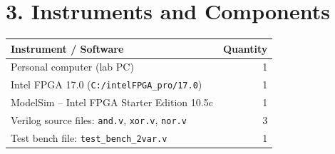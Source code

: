 \section*{3. Instruments and Components}

\begin{table}[H]
\centering
\small
\begin{tabularx}{0.8\textwidth}{X r}
\toprule
\textbf{Instrument / Software} & \textbf{Quantity} \\
\midrule
Personal computer (lab PC) & 1 \\
Intel FPGA 17.0 (\texttt{C:/intelFPGA\_pro/17.0}) & 1 \\
ModelSim -- Intel FPGA Starter Edition 10.5c & 1 \\
Verilog source files: \texttt{and.v}, \texttt{xor.v}, \texttt{nor.v} & 3 \\
Test bench file: \texttt{test\_bench\_2var.v} & 1 \\
\bottomrule
\end{tabularx}
\end{table}
